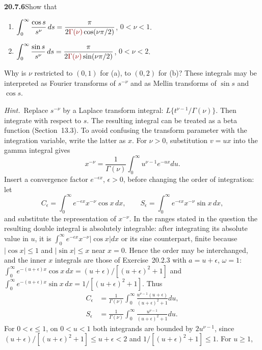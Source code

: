 \par\bigskip
\noindent\textbf{20.7.6}\quad Show that
\begin{enumerate}
\item[(a)] $\displaystyle\int_{0}^{\infty}\frac{\cos s}{s^{\nu}}\,ds
=\frac{\pi}{2\erratum{\Gamma(\nu)}\cos(\nu\pi/2)}$,
\qquad$0<\nu<1$.
\item[(b)] $\displaystyle\int_{0}^{\infty}\frac{\sin s}{s^{\nu}}\,ds
=\frac{\pi}{2\erratum{\Gamma(\nu)}\sin(\nu\pi/2)}$,
\qquad$0<\nu<2$.
\end{enumerate}
Why is $\nu$ restricted to $(0,1)$ for (a), to $(0,2)$ for (b)?
These integrals may be interpreted as Fourier transforms of
$s^{-\nu}$ and as Mellin transforms of $\sin s$ and $\cos s$.
\par\emph{Hint.}~Replace $s^{-\nu}$ by a Laplace transform
integral: $L\big\{t^{\nu-1}/\Gamma(\nu)\big\}$. Then integrate
with respect to $s$. The resulting integral can be treated as a
beta function (Section~13.3).
\solution
To avoid confusing the transform parameter with the
integration variable, write the latter as $x$. For $\nu>0$,
substitution $v=ux$ into the gamma integral gives
\[
x^{-\nu}=\frac1{\Gamma(\nu)}\int_0^\infty
u^{\nu-1}e^{-ux}du.
\]
Insert a convergence factor $e^{-\epsilon x}$, $\epsilon>0$,
before changing the order of integration: let
\[
C_\epsilon=\int_0^\infty e^{-\epsilon x}x^{-\nu}\cos x\,dx,
\qquad
S_\epsilon=\int_0^\infty e^{-\epsilon x}x^{-\nu}\sin x\,dx,
\]
and substitute the representation of $x^{-\nu}$. In the ranges
stated in the question the resulting double integral is absolutely
integrable: after integrating its absolute value in $u$, it is
$\int_0^\infty e^{-\epsilon x}x^{-\nu}|\cos x|dx$ or its sine
counterpart, finite because $|\cos x|\le1$ and $|\sin x|\le x$
near $x=0$. Hence the order may be interchanged, and the inner
$x$ integrals are those of Exercise~20.2.3 with $a=u+\epsilon$,
$\omega=1$:
$\int_0^\infty e^{-(u+\epsilon)x}\cos x\,dx=(u+\epsilon)/[(u+\epsilon)^2+1]$
and
$\int_0^\infty e^{-(u+\epsilon)x}\sin x\,dx=1/[(u+\epsilon)^2+1]$.
Thus
\begin{align*}
C_\epsilon
&=\frac1{\Gamma(\nu)}\int_0^\infty
\frac{u^{\nu-1}(u+\epsilon)}{(u+\epsilon)^2+1}du,\\
S_\epsilon
&=\frac1{\Gamma(\nu)}\int_0^\infty
\frac{u^{\nu-1}}{(u+\epsilon)^2+1}du.
\end{align*}
For $0<\epsilon\le1$, on $0<u<1$ both integrands are bounded
by $2u^{\nu-1}$, since $(u+\epsilon)/[(u+\epsilon)^2+1]\le
u+\epsilon<2$ and $1/[(u+\epsilon)^2+1]\le1$. For $u\ge1$,
